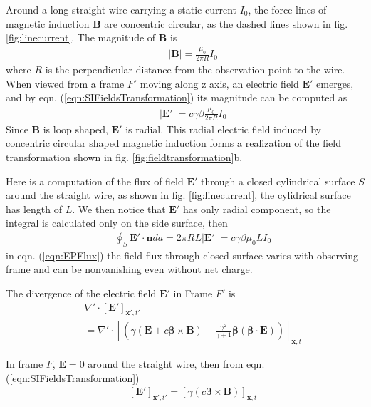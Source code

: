 \documentclass[prd,showpacs,twocolumn]{revtex4-1}
\begin{document}
Around a long straight wire carrying a static current $I_0$, the force lines of magnetic induction $\mathbf{B}$ are concentric circular, as the dashed lines shown in fig. \ref{fig:linecurrent}. The magnitude of $\mathbf{B}$ is \cite{Jackson}
\begin{eqnarray}
&&|\mathbf{B}|=\frac{\mu_0}{2\pi R}I_0
\label{eqn:linecurrentB}
\end{eqnarray}
where $R$ is the perpendicular distance from the observation point to the wire. When viewed from a frame $F'$ moving along z axis, an electric field $\mathbf{E'}$ emerges, and by eqn. (\ref{eqn:SIFieldsTransformation}) its magnitude can be computed as
\begin{eqnarray}
&&|\mathbf{E'}|=c\gamma\beta\frac{\mu_0}{2\pi R}I_0
\label{eqn:linecurrentE}
\end{eqnarray}
Since $\mathbf{B}$ is loop shaped, $\mathbf{E'}$ is radial. This radial electric field induced by concentric circular shaped magnetic induction forms a realization of the field transformation shown in fig. \ref{fig:fieldtransformation}b.

Here is a computation of the flux of field $\mathbf{E'}$ through a closed cylindrical surface $S$ around the straight wire, as shown in fig. \ref{fig:linecurrent}, the cylidrical surface has length of $L$. We then notice that $\mathbf{E'}$ has only radial component, so the integral is calculated only on the side surface, then
\begin{eqnarray}
&&\oint_S\mathbf{E'}\cdot\mathbf{n}da=2\pi RL|\mathbf{E'}|=c\gamma\beta\mu_0 LI_0
\label{eqn:EPFlux}
\end{eqnarray}
in eqn. (\ref{eqn:EPFlux}) the field flux through closed surface varies with observing frame and can be nonvanishing even without net charge.

The divergence of the electric field $\mathbf{E'}$ in Frame $F'$ is
\begin{eqnarray}
&&\nabla'\cdot[\mathbf{E'}]_{\mathbf{x'},t'}\nonumber\\
&&=\nabla'\cdot[(\gamma(\mathbf{E}+c\boldsymbol\beta\times\mathbf{B})-\frac{\gamma^2}{\gamma+1}\boldsymbol\beta(\boldsymbol\beta\cdot\mathbf{E}))]_{\mathbf{x},t}
\label{eqn:EPDivergence0}
\end{eqnarray}

In frame $F$, $\mathbf{E}=0$ around the straight wire, then from eqn. (\ref{eqn:SIFieldsTransformation})
\begin{eqnarray}
&&[\mathbf{E'}]_{\mathbf{x'},t'}=[\gamma(c\boldsymbol\beta\times\mathbf{B})]_{\mathbf{x},t}
\label{eqn:EPFromB}
\end{eqnarray}
\end{document}
